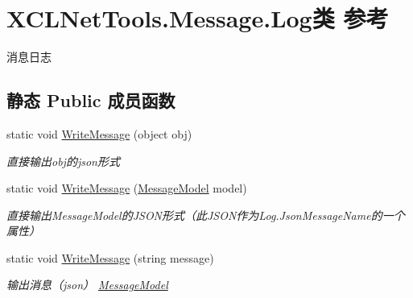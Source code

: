 \hypertarget{class_x_c_l_net_tools_1_1_message_1_1_log}{\section{X\-C\-L\-Net\-Tools.\-Message.\-Log类 参考}
\label{class_x_c_l_net_tools_1_1_message_1_1_log}
}


消息日志  


\subsection*{静态 Public 成员函数}
\begin{DoxyCompactItemize}
\item 
static void \hyperlink{class_x_c_l_net_tools_1_1_message_1_1_log_aac683d4043b6c9ac98f74d5f95dfa6f0}{Write\-Message} (object obj)
\begin{DoxyCompactList}\small\item\em 直接输出obj的json形式 \end{DoxyCompactList}\item 
static void \hyperlink{class_x_c_l_net_tools_1_1_message_1_1_log_a6038d85fedb63a3fe5dc306f1bf30011}{Write\-Message} (\hyperlink{class_x_c_l_net_tools_1_1_message_1_1_message_model}{Message\-Model} model)
\begin{DoxyCompactList}\small\item\em 直接输出\-Message\-Model的\-J\-S\-O\-N形式（此\-J\-S\-O\-N作为\-Log.\-Json\-Message\-Name的一个属性） \end{DoxyCompactList}\item 
static void \hyperlink{class_x_c_l_net_tools_1_1_message_1_1_log_a0f758d51c0cf8dd92645d44f1773715c}{Write\-Message} (string message)
\begin{DoxyCompactList}\small\item\em 输出消息（json） \hyperlink{class_x_c_l_net_tools_1_1_message_1_1_message_model}{Message\-Model} \end{DoxyCompactList}\end{DoxyCompactItemize}
